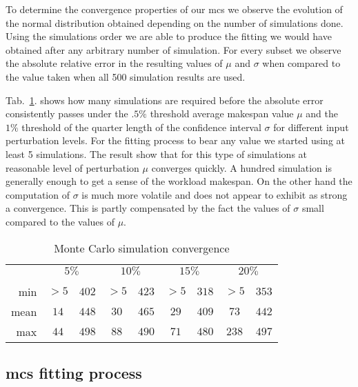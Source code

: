 \documentclass[10pt,conference,compsocconf]{IEEEtran}
\newcommand*\rot{\rotatebox{90}}
\begin{document}
To determine the convergence properties of our \ac{mcs} we observe the evolution
of the normal distribution obtained depending on the number of simulations done. 
Using the simulations order we are able to produce the fitting we would
have obtained after any arbitrary number of simulation. For every subset we
observe the absolute relative error in the resulting values of $\mu$ and $\sigma$ 
when compared to the value taken when all 500 simulation results are used. 

Tab.~\ref{tab:mcs-convergence}. shows how many simulations are required before the
absolute error consistently passes under the $.5\%$ threshold average makespan
value $\mu$ and the $1\%$ threshold of the quarter length of the confidence
interval $\sigma$ for different input perturbation levels. For the fitting
process to bear any value we started using at least 5 simulations. The result
show that for this type of simulations at reasonable level of perturbation $\mu$
converges quickly. A hundred simulation is generally enough to get a sense of
the workload makespan. On the other hand the computation of $\sigma$ is much
more volatile and does not appear to exhibit  as strong a convergence. This is
partly compensated by the fact the values of $\sigma$ small compared to the
values of $\mu$.

\begin{table}
	\centering
	\begin{tabular}{|r|cc|cc|cc|cc|}
		\cline{2-9}
		\multicolumn{1}{c|}{}& \multicolumn{2}{c|}{$5\%$}& \multicolumn{2}{c|}{$10\%$}&\multicolumn{2}{c|}{$15\%$}& \multicolumn{2}{c|}{$20\%$}\\
		\multicolumn{1}{c|}{}&\rot{$\mu.ae<.5\%$}&\rot{$\sigma.ae<1\%$}&\rot{$\mu.ae<.5\%$}&\rot{$\sigma.ae<1\%$}&\rot{$\mu.ae<.5\%$}&\rot{$\sigma.ae<1\%$}&\rot{$\mu.ae<.5\%$}&\rot{$\sigma.ae<1\%$}\\
		\hline
		min&$>5$&$402$&$>5$&$423$&$>5$&$318$&$>5$&$353$\\
		mean&$14$&$448$&$30$&$465$&$29$&$409$&$73$&$442$\\
		max&$44$&$498$&$88$&$490$&$71$&$480$&$238$&$497$\\
		\hline
	\end{tabular}
	\caption{Monte Carlo simulation convergence}
	\label{tab:mcs-convergence}
\end{table}

\subsection{\acl{mcs} fitting process}
\end{document}
